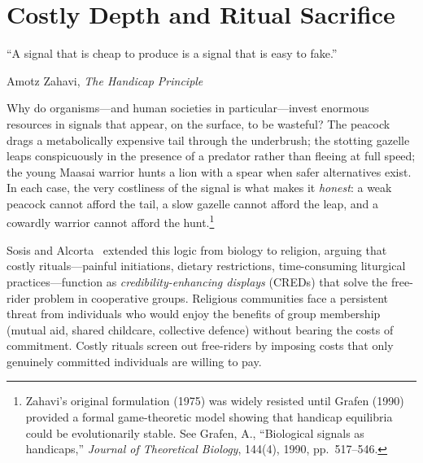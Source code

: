 
\chapter{Costly Depth and Ritual Sacrifice}
\label{ch:costly}

\epigraph{``A signal that is cheap to produce is a signal that is easy
to fake.''}{Amotz Zahavi, \textit{The Handicap Principle}}


Why do organisms---and human societies in particular---invest enormous
resources in signals that appear, on the surface, to be wasteful?  The
peacock drags a metabolically expensive tail through the underbrush; the
stotting gazelle leaps conspicuously in the presence of a predator
rather than fleeing at full speed; the young Maasai warrior hunts a lion
with a spear when safer alternatives exist.  In each case, the very
costliness of the signal is what makes it \emph{honest}: a weak peacock
cannot afford the tail, a slow gazelle cannot afford the leap, and a
cowardly warrior cannot afford the hunt.\footnote{Zahavi's original
  formulation (1975) was widely resisted until Grafen (1990) provided a
  formal game-theoretic model showing that handicap equilibria could be
  evolutionarily stable.  See Grafen, A., ``Biological signals as
  handicaps,'' \textit{Journal of Theoretical Biology}, 144(4), 1990,
  pp.~517--546.}

Sosis and Alcorta~\cite{sosis2003} extended this logic from biology to
religion, arguing that costly rituals---painful initiations, dietary
restrictions, time-consuming liturgical practices---function as
\emph{credibility-enhancing displays} (CREDs) that solve the free-rider
problem in cooperative groups.  Religious communities face a persistent
threat from individuals who would enjoy the benefits of group membership
(mutual aid, shared childcare, collective defence) without bearing the
costs of commitment.  Costly rituals screen out free-riders by imposing
costs that only genuinely committed individuals are willing to pay.

